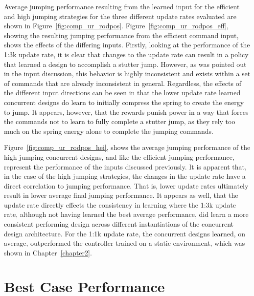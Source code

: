 Average jumping performance resulting from the learned input for the efficient and high jumping strategies for the three different update rates evaluated are shown in Figure~\ref{fig:comp_ur_rodpos}. Figure~\ref{fig:comp_ur_rodpos_eff}, showing the resulting jumping performance from the efficient command input, shows the effects of the differing inputs. Firstly, looking at the performance of the 1:3k update rate, it is clear that changes to the update rate can result in a policy that learned a design to accomplish a stutter jump. However, as was pointed out in the input discussion, this behavior is highly inconsistent and exists within a set of commands that are already inconsistent in general. Regardless, the effects of the different input directions can be seen in that the lower update rate learned concurrent designs do learn to initially compress the spring to create the energy to jump. It appears, however, that the rewards punish power in a way that forces the commands not to learn to fully complete a stutter jump, as they rely too much on the spring energy alone to complete the jumping commands.

Figure~\ref{fig:comp_ur_rodpos_hei}, shows the average jumping performance of the high jumping concurrent designs, and like the efficient jumping performance, represent the performance of the inputs discussed previously. It is apparent that, in the case of the high jumping strategies, the changes in the update rate have a direct correlation to jumping performance. That is, lower update rates ultimately result in lower average final jumping performance. It appears as well, that the update rate directly effects the consistency in learning where the 1:3k update rate, although not having learned the best average performance, did learn a more consistent performing design across different instantiations of the concurrent design architecture. For the 1:1k update rate, the concurrent designs learned, on average, outperformed the controller trained on a static environment, which was shown in Chapter~\ref{chapter2}.

\section{Best Case Performance}


